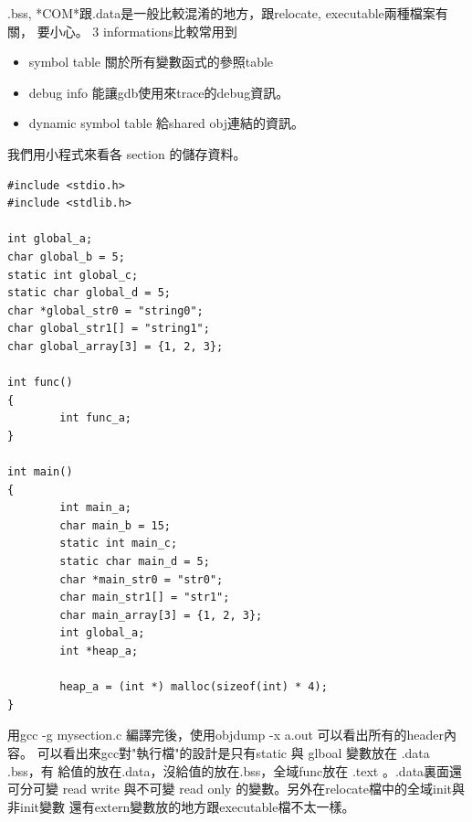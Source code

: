     .bss, *COM*跟.data是一般比較混淆的地方，跟relocate, executable兩種檔案有關，
    要小心。 3 informations比較常用到
    \begin{itemize}
      \item symbol table 關於所有變數函式的參照table
      \item debug info 能讓gdb使用來trace的debug資訊。
      \item dynamic symbol table 給shared obj連結的資訊。
    \end{itemize}
    我們用小程式來看各 section 的儲存資料。
    \begin{verbatim}
#include <stdio.h>
#include <stdlib.h>

int global_a;
char global_b = 5;
static int global_c;
static char global_d = 5;
char *global_str0 = "string0";
char global_str1[] = "string1";
char global_array[3] = {1, 2, 3};

int func()
{
        int func_a;
}

int main()
{
        int main_a;
        char main_b = 15;
        static int main_c;
        static char main_d = 5;
        char *main_str0 = "str0";
        char main_str1[] = "str1";
        char main_array[3] = {1, 2, 3};
        int global_a;
        int *heap_a;

        heap_a = (int *) malloc(sizeof(int) * 4);
}
  \end{verbatim}
  用gcc -g mysection.c 編譯完後，使用objdump -x a.out 可以看出所有的header內容。
  可以看出來gcc對"執行檔"的設計是只有static 與 glboal 變數放在 .data .bss，有
  給值的放在.data，沒給值的放在.bss，全域func放在 .text 。.data裏面還可分可變
  read write 與不可變 read only 的變數。另外在relocate檔中的全域init與非init變數
  還有extern變數放的地方跟executable檔不太一樣。

